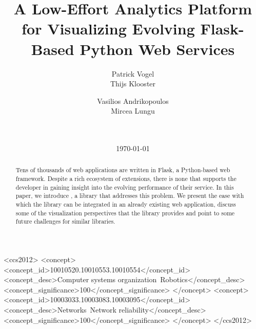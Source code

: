 \documentclass{sig-alternate-05-2015}
\begin{document}
	
	
	
%
\title{A Low-Effort Analytics Platform for Visualizing Evolving Flask-Based Python Web Services}


\author{
\alignauthor Patrick Vogel\\
%
\alignauthor Thijs Klooster\\
%
\and
\alignauthor Vasilios Andrikopoulos\\
%
\alignauthor Mircea Lungu\\
%
\sharedaffiliation
{}\\
\\
}
\date{\today}

\maketitle

\begin{abstract}
  Tens of thousands of web applications are written in Flask, a Python-based web framework. Despite a rich ecosystem of extensions, there is none that supports the developer in gaining insight into the evolving performance of their service. In this paper, we introduce \tool, a library that addresses this problem. We present the ease with which the library can be integrated in an already existing web application, discuss some of the visualization perspectives that the library provides and point to some future challenges for similar libraries.

\end{abstract}

\begin{CCSXML}
	<ccs2012>
	<concept>
	<concept_id>10010520.10010553.10010554</concept_id>
	<concept_desc>Computer systems organization~Robotics</concept_desc>
	<concept_significance>100</concept_significance>
	</concept>
	<concept>
	<concept_id>10003033.10003083.10003095</concept_id>
	<concept_desc>Networks~Network reliability</concept_desc>
	<concept_significance>100</concept_significance>
	</concept>
	</ccs2012>  
\end{CCSXML}
\end{document}
